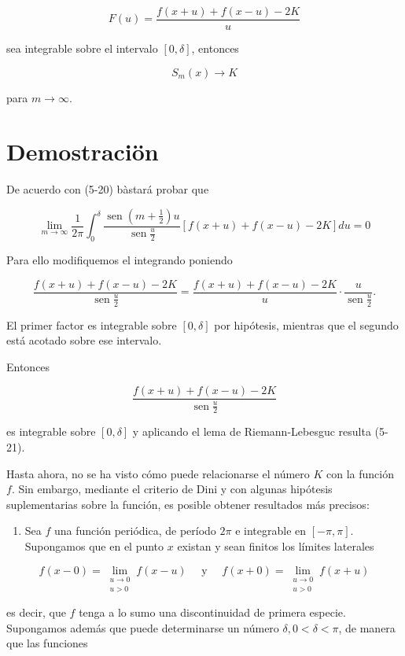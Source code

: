 \documentclass[10pt]{article}
\theoremstyle{plain}
\theoremstyle{definition}
\theoremstyle{remark}
\begin{document}
$$
F(u)=\frac{f(x+u)+f(x-u)-2 K}{u}
$$

sea integrable sobre el intervalo $[0, \delta]$, entonces

$$
S_{m}(x) \rightarrow K
$$

para $m \rightarrow \infty$.

\section*{Demostraciön}
De acuerdo con (5-20) bàstará probar que


\begin{equation*}
\lim _{m \rightarrow \infty} \frac{1}{2 \pi} \int_{0}^{\delta} \frac{\operatorname{sen}\left(m+\frac{1}{2}\right) u}{\operatorname{sen} \frac{u}{2}}[f(x+u)+f(x-u)-2 K] d u=0 \tag{5-21}
\end{equation*}


Para ello modifiquemos el integrando poniendo

$$
\frac{f(x+u)+f(x-u)-2 K}{\operatorname{sen} \frac{u}{2}}=\frac{f(x+u)+f(x-u)-2 K}{u} \cdot \frac{u}{\operatorname{sen} \frac{u}{2}} .
$$

El primer factor es integrable sobre $[0, \delta]$ por hipótesis, mientras que el segundo está acotado sobre ese intervalo.

Entonces

$$
\frac{f(x+u)+f(x-u)-2 K}{\operatorname{sen} \frac{u}{2}}
$$

es integrable sobre $[0, \delta]$ y aplicando el lema de Riemann-Lebesguc resulta (5-21).

Hasta ahora, no se ha visto cómo puede relacionarse el número $K$ con la función $f$. Sin embargo, mediante el criterio de Dini y con algunas hipótesis suplementarias sobre la función, es posible obtener resultados más precisos:

\begin{enumerate}
  \item Sea $f$ una función periódica, de período $2 \pi$ e integrable en $[-\pi, \pi]$. Supongamos que en el punto $x$ existan y sean finitos los límites laterales
\end{enumerate}

$$
f(x-0)=\lim _{\substack{u \rightarrow 0 \\ u>0}} f(x-u) \quad \text { y } \quad f(x+0)=\lim _{\substack{u \rightarrow 0 \\ u>0}} f(x+u)
$$

es decir, que $f$ tenga a lo sumo una discontinuidad de primera especie.\\
Supongamos además que puede determinarse un número $\delta, 0<\delta<\pi$, de manera que las funciones
\end{document}
